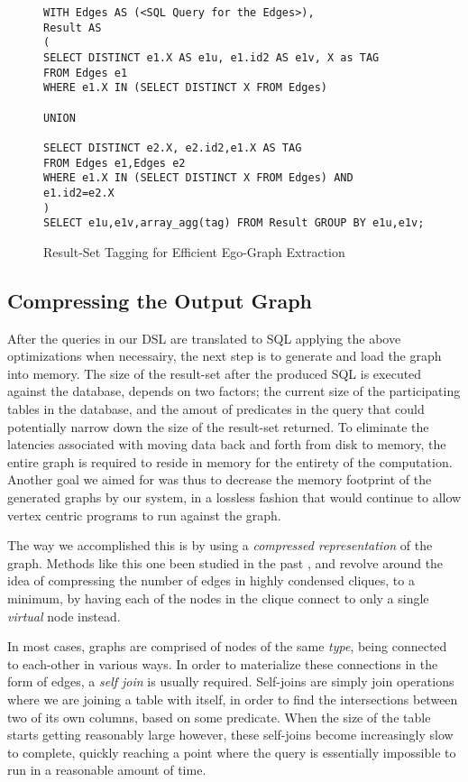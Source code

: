 \documentclass[11pt,letterpaper]{article}
\begin{document}
\begin{figure}[t]
\scriptsize
\begin{lstlisting}[breaklines,basicstyle=\ttfamily]
WITH Edges AS (<SQL Query for the Edges>),
Result AS
(
SELECT DISTINCT e1.X AS e1u, e1.id2 AS e1v, X as TAG
FROM Edges e1
WHERE e1.X IN (SELECT DISTINCT X FROM Edges)

UNION

SELECT DISTINCT e2.X, e2.id2,e1.X AS TAG
FROM Edges e1,Edges e2
WHERE e1.X IN (SELECT DISTINCT X FROM Edges) AND e1.id2=e2.X
)
SELECT e1u,e1v,array_agg(tag) FROM Result GROUP BY e1u,e1v;
\end{lstlisting}
\vspace{-10pt}
\caption{Result-Set Tagging for Efficient Ego-Graph Extraction}
\vspace{-10pt}
\label{fig:tagging}
\end{figure}


\subsection*{Compressing the Output Graph}

After the queries in our DSL are translated to SQL applying the above optimizations when necessairy, the next step is to generate and load the graph into memory. The size of the result-set after the produced SQL is executed against the database, depends on two factors; the current size of the participating tables in the database, and the amout of predicates in the query that could potentially narrow down the size of the result-set returned. To eliminate  the latencies associated with moving data back and forth from disk to memory, the entire graph is required to reside in memory for the entirety of the computation. Another goal we aimed for was thus to decrease the memory footprint of the generated graphs by our system, in a lossless fashion that would continue to allow vertex centric programs to run against the graph.

The way we accomplished this is by using a \textit{compressed representation} of the graph. Methods like this one been studied in the past \cite{feder_1995}, and revolve around the idea of compressing the number of edges in highly condensed cliques, to a minimum, by having each of the nodes in the clique connect to only a single \textit{virtual} node instead.

In most cases, graphs are comprised of nodes of the same \textit{type}, being connected to each-other in various ways. In order to materialize these connections in the form of edges, a \textit{self join} is usually required. Self-joins are simply join operations where we are joining a table with itself, in order to find the intersections between two of its own columns, based on some predicate. When the size of the table starts getting reasonably large however, these self-joins become increasingly slow to complete, quickly reaching a point where the query is essentially impossible to run in a reasonable amount of time.
\end{document}
